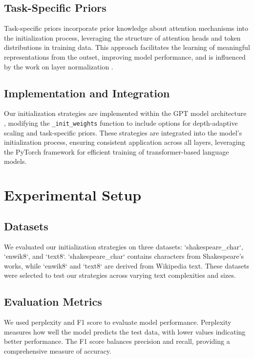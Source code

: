 \documentclass{article} %
\begin{document}
\subsection{Task-Specific Priors}
\label{subsec:task_specific_priors}
Task-specific priors incorporate prior knowledge about attention mechanisms into the initialization process, leveraging the structure of attention heads and token distributions in training data. This approach facilitates the learning of meaningful representations from the outset, improving model performance, and is influenced by the work on layer normalization \cite{ba2016layer}.

\subsection{Implementation and Integration}
\label{subsec:implementation}
Our initialization strategies are implemented within the GPT model architecture \cite{karpathy2023nanogpt}, modifying the \texttt{\_init\_weights} function to include options for depth-adaptive scaling and task-specific priors. These strategies are integrated into the model's initialization process, ensuring consistent application across all layers, leveraging the PyTorch framework \cite{paszke2019pytorch} for efficient training of transformer-based language models.

\section{Experimental Setup}
\label{sec:experimental}
\subsection{Datasets}
We evaluated our initialization strategies on three datasets: `shakespeare\_char`, `enwik8`, and `text8`. `shakespeare\_char` contains characters from Shakespeare's works, while `enwik8` and `text8` are derived from Wikipedia text. These datasets were selected to test our strategies across varying text complexities and sizes.

\subsection{Evaluation Metrics}
We used perplexity and F1 score to evaluate model performance. Perplexity measures how well the model predicts the test data, with lower values indicating better performance. The F1 score balances precision and recall, providing a comprehensive measure of accuracy.
\end{document}
